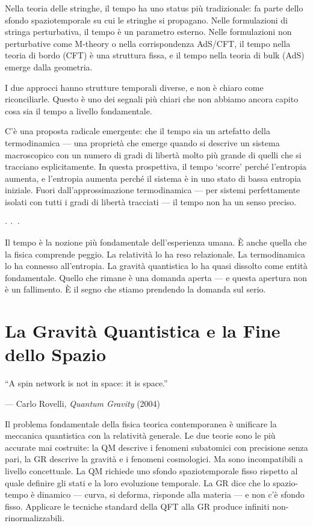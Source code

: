 \documentclass[12pt,a4paper,openany]{book}
\newcommand{\sezione}[1]{\vspace{1.2em}{\large\bfseries #1}\vspace{0.5em}\par}
\newcommand{\puntini}{\begin{center}$\cdot\ \cdot\ \cdot$\end{center}\vspace{0.3em}}
\begin{document}
Nella teoria delle stringhe, il tempo ha uno status più tradizionale: fa parte dello sfondo spaziotemporale su cui le stringhe si propagano. Nelle formulazioni di stringa perturbativa, il tempo è un parametro esterno. Nelle formulazioni non perturbative come M-theory o nella corrispondenza AdS/CFT, il tempo nella teoria di bordo (CFT) è una struttura fissa, e il tempo nella teoria di bulk (AdS) emerge dalla geometria.

I due approcci hanno strutture temporali diverse, e non è chiaro come riconciliarle. Questo è uno dei segnali più chiari che non abbiamo ancora capito cosa sia il tempo a livello fondamentale.

C'è una proposta radicale emergente: che il tempo sia un artefatto della termodinamica --- una proprietà che emerge quando si descrive un sistema macroscopico con un numero di gradi di libertà molto più grande di quelli che si tracciano esplicitamente. In questa prospettiva, il tempo `scorre' perché l'entropia aumenta, e l'entropia aumenta perché il sistema è in uno stato di bassa entropia iniziale. Fuori dall'approssimazione termodinamica --- per sistemi perfettamente isolati con tutti i gradi di libertà tracciati --- il tempo non ha un senso preciso.

\puntini

Il tempo è la nozione più fondamentale dell'esperienza umana. È anche quella che la fisica comprende peggio. La relatività lo ha reso relazionale. La termodinamica lo ha connesso all'entropia. La gravità quantistica lo ha quasi dissolto come entità fondamentale. Quello che rimane è una domanda aperta --- e questa apertura non è un fallimento. È il segno che stiamo prendendo la domanda sul serio.

\chapter{La Gravità Quantistica e la Fine dello Spazio}

\epigraph{``A spin network is not in space: it is space.''}{--- Carlo Rovelli, \textit{Quantum Gravity} (2004)}

\sezione{Il problema dell'unificazione}

Il problema fondamentale della fisica teorica contemporanea è unificare la meccanica quantistica con la relatività generale. Le due teorie sono le più accurate mai costruite: la QM descrive i fenomeni subatomici con precisione senza pari, la GR descrive la gravità e i fenomeni cosmologici. Ma sono incompatibili a livello concettuale. La QM richiede uno sfondo spaziotemporale fisso rispetto al quale definire gli stati e la loro evoluzione temporale. La GR dice che lo spazio-tempo è dinamico — curva, si deforma, risponde alla materia — e non c'è sfondo fisso. Applicare le tecniche standard della QFT alla GR produce infiniti non-rinormalizzabili.
\end{document}
